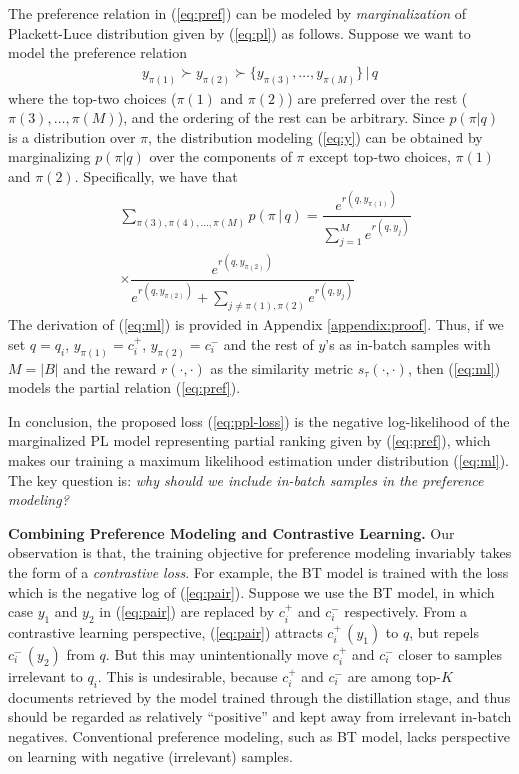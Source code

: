 The preference relation in (\ref{eq:pref}) can be modeled by \emph{marginalization} of Plackett-Luce distribution given by (\ref{eq:pl}) as follows. Suppose we want to model the preference relation
\begin{align}
y_{\pi(1)} \succ y_{\pi(2)} \succ \{y_{\pi(3)},\ldots,y_{\pi(M)}\}\,|\, q\label{eq:y}
\end{align}
where the top-two choices ($\pi(1)$ and $\pi(2)$) are preferred over the rest ($\pi(3),\ldots,\pi(M)$), and the ordering of the rest can be arbitrary.  Since $p(\pi|q)$ is a distribution over $\pi$, the distribution modeling (\ref{eq:y}) can be obtained by marginalizing $p(\pi|q)$ over the components of $\pi$ except top-two choices, $\pi(1)$ and $\pi(2)$. Specifically, we have  that
\begin{align}
&\sum_{\pi(3),\pi(4),...,\pi(M)}p(\pi \, |\, q) =\dfrac{e^{r(q, y_{\pi(1)})}}{\sum_{j=1}^M e^{r(q,y_j)}} \nonumber \\ &\times \dfrac{e^{r(q, y_{\pi(2)})}}{e^{r(q, y_{\pi(2)})}+\sum\limits_{j\neq\pi(1),\pi(2)} e^{r(q,y_j)}}\label{eq:ml}
\end{align}
The derivation of (\ref{eq:ml}) is provided in Appendix \ref{appendix:proof}.
Thus, if we set $q=q_i$, $y_{\pi(1)} = c_i^+$,  $y_{\pi(2)} = c_i^-$ and the rest of $y$'s as in-batch samples with $M=|B|$ and the reward $r(\cdot,\cdot)$ as the similarity metric $s_\tau(\cdot,\cdot)$, then (\ref{eq:ml}) models the partial relation (\ref{eq:pref}).


In conclusion, the proposed loss (\ref{eq:ppl-loss}) is the negative log-likelihood of the marginalized PL model representing partial ranking given by (\ref{eq:pref}), which makes our training a maximum likelihood estimation under distribution (\ref{eq:ml}). The key question is: \emph{why should we include in-batch samples in the preference modeling?}

\noindent\textbf{Combining Preference Modeling {and} Contrastive Learning.} Our observation is that, the training objective for preference modeling invariably takes the form of a \emph{contrastive loss}. For example, the BT model is trained with the loss which is the negative log of (\ref{eq:pair}). Suppose we use the BT model, in which case $y_1$ and $y_2$ in (\ref{eq:pair}) are replaced by $c_i^+$ and $c_i^-$ respectively. From a contrastive learning perspective, (\ref{eq:pair}) attracts $c_i^+\,(y_1)$ to $q$, but repels $c_i^-\,(y_2)$ from $q$. But this may unintentionally move $c_i^+$ and $c_i^-$ closer to samples irrelevant to $q_i$. This is undesirable, because $c_i^+$ and $c_i^-$ are among top-$K$ documents retrieved by the model trained through the distillation stage, and thus should be regarded as relatively ``positive'' and kept away from irrelevant in-batch negatives. Conventional preference modeling, such as  BT model, lacks perspective on learning with negative (irrelevant) samples.


